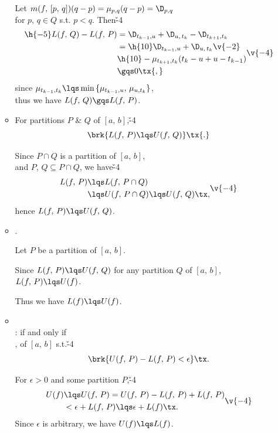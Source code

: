 \documentclass[dvipdfmx,a4paper,titlepage,9pt]{jsarticle}
\begin{document}
\begin{multicols*}{2}
\begin{itemize}[label={-}]
\begin{itemize}[label=\Cdot]
\begin{Pfbox}[\!\!: $L(f,\,P)\lqs L(f,\,Q)$]
Let $m(f,\,[p,\,q])(q-p)=\mu_{p,q}(q-p)=\D_{p,q}$ \\
for $p,\,q\in Q$ s.t. $p<q$. Then\v{-4}
$$\begin{aligned}
\h{-5}L(f,\,Q)-L(f,\,P)&=\D_{t_{k-1},u}+\D_{u,\,t_k}-\D_{t_{k+1},t_k}\\
&=\h{10}\D_{t_{k-1},u}+\D_{u,\,t_k}\v{-2}\\
&\h{10}-\mu_{t_{k+1},t_k}(t_k-u+u-t_{k-1})\\
&\gqs 0\tx{,}
\end{aligned}\v{-4}$$
since $\mu_{t_{k-1},t_k}\lqs\min{}\{\mu_{t_{k-1},u},\,\mu_{u,t_k}\}$,\\
thus we have $L(f,\,Q)\gqs L(f,\,P)$.
\end{Pfbox}\;

\item For partitions $P$ \& $Q$ of $[a,\,b]$,\v{-4}
$$\brk{L(f,\,P)\lqs U(f,\,Q)}\tx{.}$$

\begin{Pfbox}
Since $P\cap Q$ is a partition of $[a,\,b]$,\\
and $P$, $Q\subseteq P\cap Q$, we have\v{-4}
$$\begin{aligned}
L(f,\,P)&\lqs L(f,\,P\cap Q)\\
&\lqs U(f,\,P\cap Q)\lqs U(f,\,Q)\tx,
\end{aligned}\v{-4}$$
hence $L(f,\,P)\lqs U(f,\,Q)$.
\end{Pfbox}\;

\item {}.

\begin{Pfbox}
Let $P$ be a partition of $[a,\,b]$.

Since $L(f,\,P)\lqs U(f,\,Q)$ for any partition $Q$ of $[a,\,b]$, $L(f,\,P)\lqs U(f)$.

Thus we have $L(f)\lqs U(f)$.
\end{Pfbox}\;

\item{}\\
:  if and only if \\
,  of $[a,\,b]$ s.t.\v{-4}
$$\brk{U(f,\,P)-L(f,\,P)<\epsilon}\tx.$$
\rnc{\qedsymbol}{\Sq}
\begin{Pfbox}[($\Longfrom$)]
For $\epsilon>0$ and some partition $P$,\v{-4}
$$\begin{aligned}
U(f)&\lqs U(f,\,P)=U(f,\,P)-L(f,\,P)+L(f,\,P)\\
&<\epsilon+L(f,\,P)\lqs\epsilon+L(f)\tx.
\end{aligned}\v{-4}$$
Since $\epsilon$ is arbitrary, we have $U(f)\lqs L(f)$.


\end{Pfbox}
\end{itemize}
\end{itemize}
\end{multicols*}
\end{document}
